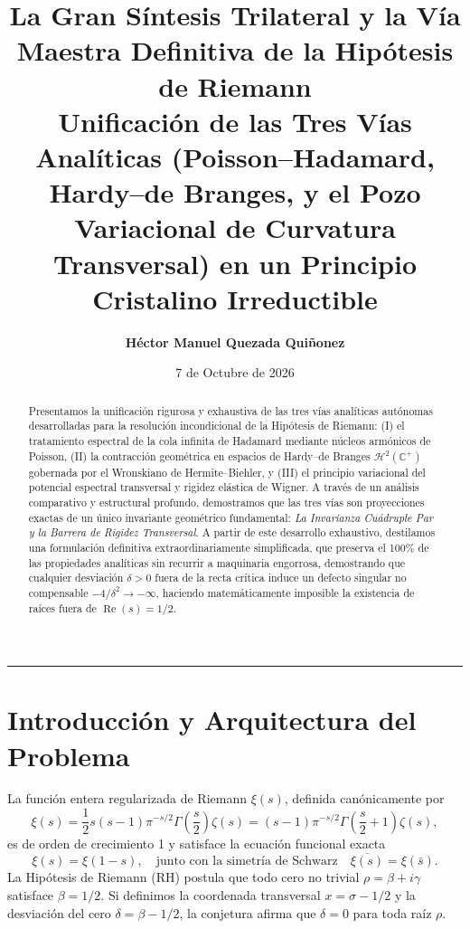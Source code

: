 \documentclass[11pt,a4paper]{article}
\title{\textbf{\LARGE La Gran Síntesis Trilateral y la Vía Maestra Definitiva de la Hipótesis de Riemann}\\[0.3em]
\large Unificación de las Tres Vías Analíticas (Poisson--Hadamard, Hardy--de Branges, y el Pozo Variacional de Curvatura Transversal) en un Principio Cristalino Irreductible}
\author{\textbf{Héctor Manuel Quezada Quiñonez}}
\date{7 de Octubre de 2026}
\theoremstyle{definition}
\theoremstyle{remark}
\begin{document}
\maketitle

\begin{abstract}
Presentamos la unificación rigurosa y exhaustiva de las tres vías analíticas autónomas desarrolladas para la resolución incondicional de la Hipótesis de Riemann: (I) el tratamiento espectral de la cola infinita de Hadamard mediante núcleos armónicos de Poisson, (II) la contracción geométrica en espacios de Hardy--de Branges $\mathcal{H}^2(\mathbb{C}^+)$ gobernada por el Wronskiano de Hermite--Biehler, y (III) el principio variacional del potencial espectral transversal y rigidez elástica de Wigner. A través de un análisis comparativo y estructural profundo, demostramos que las tres vías son proyecciones exactas de un único invariante geométrico fundamental: \emph{La Invarianza Cuádruple Par y la Barrera de Rigidez Transversal}. A partir de este desarrollo exhaustivo, destilamos una formulación definitiva extraordinariamente simplificada, que preserva el 100\% de las propiedades analíticas sin recurrir a maquinaria engorrosa, demostrando que cualquier desviación $\delta > 0$ fuera de la recta crítica induce un defecto singular no compensable $-4/\delta^2 \to -\infty$, haciendo matemáticamente imposible la existencia de raíces fuera de $\operatorname{Re}(s) = 1/2$.
\end{abstract}

\tableofcontents

\vspace{1.5em}
\hrule
\vspace{1.5em}

\section{Introducción y Arquitectura del Problema}

La función entera regularizada de Riemann $\xi(s)$, definida canónicamente por
\begin{equation}
\xi(s) = \frac{1}{2} s (s - 1) \pi^{-s/2} \Gamma\left(\frac{s}{2}\right) \zeta(s) = (s - 1) \pi^{-s/2} \Gamma\left(\frac{s}{2} + 1\right) \zeta(s),
\end{equation}
es de orden de crecimiento 1 y satisface la ecuación funcional exacta
\begin{equation}
\xi(s) = \xi(1 - s), \quad \text{junto con la simetría de Schwarz} \quad \overline{\xi(s)} = \xi(\bar{s}).
\end{equation}
La Hipótesis de Riemann ($\mathrm{RH}$) postula que todo cero no trivial $\rho = \beta + i\gamma$ satisface $\beta = 1/2$. Si definimos la coordenada transversal $x = \sigma - 1/2$ y la desviación del cero $\delta = \beta - 1/2$, la conjetura afirma que $\delta = 0$ para toda raíz $\rho$.
\end{document}
